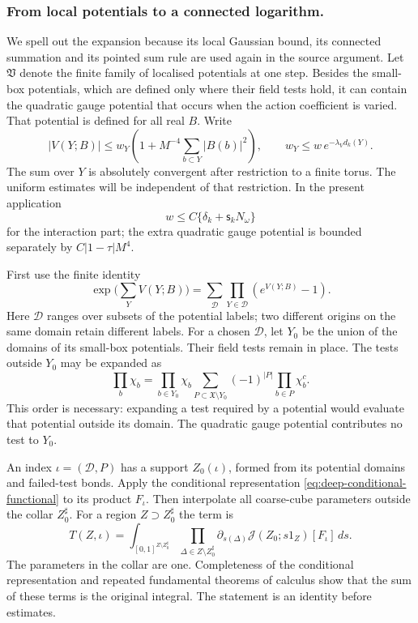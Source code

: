 \documentclass[11pt,letterpaper,reqno]{amsart}
\theoremstyle{definition}
\theoremstyle{remark}
\begin{document}
\subsubsection*{From local potentials to a connected logarithm.}
We spell out the expansion because its local Gaussian bound, its
connected summation and its pointed sum rule are used again in the
source argument. Let $\mathfrak V$ denote the finite family of
localised potentials at one step. Besides the small-box potentials,
which are defined only where their field tests hold, it can contain
the quadratic gauge potential that occurs when the action coefficient
is varied. That potential is defined for all real $B$. Write
\[
 |V(Y;B)|\le w_Y\left(1+M^{-4}
                         \sum_{b\subset Y}|B(b)|^2\right),
 \qquad w_Y\le w\,e^{-\lambda_V d_k(Y)}.
\]
The sum over $Y$ is absolutely convergent after restriction to a
finite torus. The uniform estimates will be independent of that
restriction. In the present application
\[
 w\le C\{\delta_k+\mathsf s_kN_\omega\}
\]
for the interaction part; the extra quadratic gauge potential is
bounded separately by $C|1-\tau|M^4$.

First use the finite identity
\begin{equation}\label{eq:deep-mayer-identity}
 \exp\Big(\sum_YV(Y;B)\Big)
    =\sum_{\mathcal D}\prod_{Y\in\mathcal D}(e^{V(Y;B)}-1).
\end{equation}
Here $\mathcal D$ ranges over subsets of the potential labels;
two different origins on the same domain retain different labels.
For a chosen $\mathcal D$, let $Y_0$ be the union of the domains
of its small-box potentials. Their field tests remain in place.
The tests outside $Y_0$ may be expanded as
\begin{equation}\label{eq:deep-test-expansion}
 \prod_b\chi_b
   =\prod_{b\in Y_0}\chi_b
       \sum_{P\subset\mathfrak X\setminus Y_0}
                                (-1)^{|P|}\prod_{b\in P}\chi_b^c.
\end{equation}
This order is necessary: expanding a test required by a potential
would evaluate that potential outside its domain. The quadratic
gauge potential contributes no test to $Y_0$.

An index $\iota=(\mathcal D,P)$ has a support $Z_0(\iota)$,
formed from its potential domains and failed-test bonds. Apply the
conditional representation
\eqref{eq:deep-conditional-functional} to its product $F_\iota$.
Then interpolate all coarse-cube parameters outside the collar
$Z_0^\sharp$. For a region $Z\supset Z_0^\sharp$ the term is
\begin{equation}\label{eq:deep-polymer-term}
 T(Z,\iota)=
 \int_{[0,1]^{Z\setminus Z_0^\sharp}}
   \prod_{\Delta\in Z\setminus Z_0^\sharp}\partial_{s(\Delta)}
       \mathcal J(Z_0;s1_Z)[F_\iota]\,ds.
\end{equation}
The parameters in the collar are one. Completeness of the
conditional representation and repeated fundamental theorems of
calculus show that the sum of these terms is the original
integral. The statement is an identity before estimates.
\end{document}
